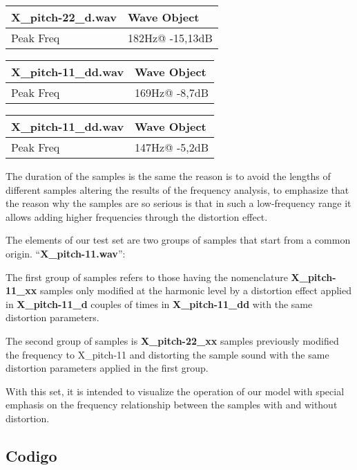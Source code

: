 \documentclass[
]{article}
\begin{document}
\begin{longtable}[]{@{}ll@{}}
\toprule
X\_pitch-22\_d.wav & Wave Object \\
\midrule
\endhead
Peak Freq & 182Hz@ -15,13dB \\
\bottomrule
\end{longtable}

\begin{longtable}[]{@{}ll@{}}
\toprule
X\_pitch-11\_dd.wav & Wave Object \\
\midrule
\endhead
Peak Freq & 169Hz@ -8,7dB \\
\bottomrule
\end{longtable}

\begin{longtable}[]{@{}ll@{}}
\toprule
X\_pitch-11\_dd.wav & Wave Object \\
\midrule
\endhead
Peak Freq & 147Hz@ -5,2dB \\
\bottomrule
\end{longtable}

The duration of the samples is the same the reason is to avoid the
lengths of different samples altering the results of the frequency
analysis, to emphasize that the reason why the samples are so serious is
that in such a low-frequency range it allows adding higher frequencies
through the distortion effect.

The elements of our test set are two groups of samples that start from a
common origin. ``\textbf{X\_pitch-11.wav}'':

The first group of samples refers to those having the nomenclature
\textbf{X\_pitch-11\_xx} samples only modified at the harmonic level by
a distortion effect applied in \textbf{X\_pitch-11\_d} couples of times
in \textbf{X\_pitch-11\_dd} with the same distortion parameters.

The second group of samples is \textbf{X\_pitch-22\_xx} samples
previously modified the frequency to X\_pitch-11 and distorting the
sample sound with the same distortion parameters applied in the first
group.

With this set, it is intended to visualize the operation of our model
with special emphasis on the frequency relationship between the samples
with and without distortion.

\vspace{15pt}

\newpage

\hypertarget{codigo}{%
\subsection{Codigo}\label{codigo}}
\end{document}
